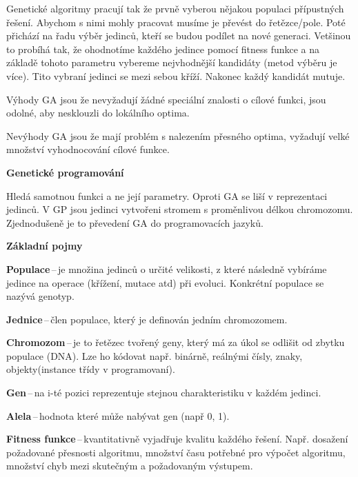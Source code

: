 Genetické algoritmy pracují tak že prvně vyberou nějakou populaci přípustných řešení. Abychom s nimi mohly pracovat musíme je převést do řetězce/pole. Poté přichází na řadu výběr jedinců, kteří se budou podílet na nové generaci. Vetšinou to probíhá tak, že ohodnotíme každého jedince pomocí fitness funkce a na základě tohoto parametru vybereme nejvhodnější kandidáty (metod výběru je více). Tito vybraní jedinci se mezi sebou kříží. Nakonec každý kandidát mutuje. 

Výhody GA jsou že nevyžadují žádné speciální znalosti o cílové funkci, jsou odolné, aby nesklouzli do lokálního optima.

Nevýhody GA jsou že mají problém s nalezením přesného optima, vyžadují velké množství vyhodnocování cílové funkce.

\begin{Large}\vspace{0,5cm} \textbf{Genetické programování}
\end{Large}

Hledá samotnou funkci a ne její parametry. Oproti GA se liší v reprezentaci jedinců. V GP jsou jedinci vytvořeni stromem s proměnlivou délkou chromozomu. Zjednodušeně je to převedení GA do programovacích jazyků.

\begin{Large}\vspace{0,5cm} \textbf{Základní pojmy}
\end{Large}

\textbf{Populace}\,--\,je množina jedinců o určité velikosti, z které následně vybíráme jedince na operace (křížení, mutace atd) při evoluci. Konkrétní populace se nazývá genotyp. 

\textbf{Jednice}\,--\,člen populace, který je definován jedním chromozomem.

\textbf{Chromozom}\,--\,je to řetězec tvořený geny, který má za úkol se odlišit od zbytku populace (DNA). Lze ho kódovat např. binárně, reálnými čísly, znaky, objekty(instance třídy v programovaní).

\textbf{Gen}\,--\,na i-té pozici reprezentuje stejnou charakteristiku v každém jedinci.

\textbf{Alela}\,--\,hodnota které může nabývat gen (např 0, 1).

\textbf{Fitness funkce}\,--\,kvantitativně vyjadřuje kvalitu každého řešení. Např. dosažení požadované přesnosti algoritmu, množství času potřebné pro výpočet algoritmu, množství chyb mezi skutečným a požadovaným výstupem.

